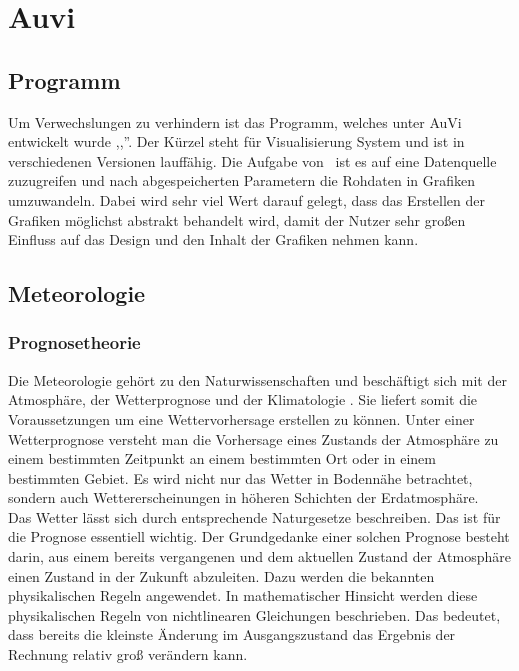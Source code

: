 \section{Auvi}

\subsection{Programm} %
Um Verwechslungen zu verhindern ist das Programm,
welches unter AuVi entwickelt wurde ,,\vs ''.
Der Kürzel steht für Visualisierung System und ist in verschiedenen Versionen lauffähig.
Die Aufgabe von \vs\ ist es auf eine Datenquelle zuzugreifen
und nach abgespeicherten Parametern die Rohdaten in Grafiken umzuwandeln.
Dabei wird sehr viel Wert darauf gelegt,
dass das Erstellen der Grafiken möglichst abstrakt behandelt wird,
damit der Nutzer sehr großen Einfluss auf das Design und den Inhalt der Grafiken nehmen kann.

\subsection{Meteorologie} %

\subsubsection{Prognosetheorie} %
Die Meteorologie gehört zu den Naturwissenschaften und
beschäftigt sich mit der Atmosphäre, der Wetterprognose und der Klimatologie \cite{meteorologie}.
Sie liefert somit die Voraussetzungen um eine Wettervorhersage erstellen zu können.
Unter einer Wetterprognose versteht man die Vorhersage eines Zustands
der Atmosphäre zu einem bestimmten Zeitpunkt an einem bestimmten Ort
oder in einem bestimmten Gebiet.
Es wird nicht nur das Wetter in Bodennähe betrachtet,
sondern auch Wettererscheinungen in höheren Schichten der Erdatmosphäre.
\\
Das Wetter lässt sich durch entsprechende Naturgesetze beschreiben.
Das ist für die Prognose essentiell wichtig.
Der Grundgedanke einer solchen Prognose besteht darin,
aus einem bereits vergangenen und dem aktuellen Zustand
der Atmosphäre einen Zustand in der Zukunft abzuleiten.
Dazu werden die bekannten physikalischen Regeln angewendet.
In mathematischer Hinsicht werden diese physikalischen Regeln von
nichtlinearen Gleichungen beschrieben.
Das bedeutet, dass bereits die kleinste Änderung im Ausgangszustand
das Ergebnis der Rechnung relativ groß verändern kann. %


